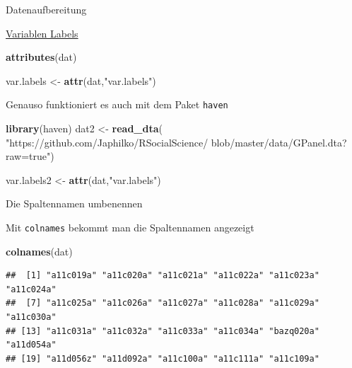 \documentclass[ignorenonframetext,]{beamer}
\newenvironment{Shaded}{}{}
\newcommand{\KeywordTok}[1]{\textcolor[rgb]{0.00,0.44,0.13}{\textbf{{#1}}}}
\newcommand{\StringTok}[1]{\textcolor[rgb]{0.25,0.44,0.63}{{#1}}}
\newcommand{\NormalTok}[1]{{#1}}
\begin{document}
\begin{frame}[fragile]{Datenaufbereitung}
\begin{block}{\href{https://stackoverflow.com/questions/2151147/using-stata-variable-labels-in-r}{Variablen
Labels}}
\begin{Shaded}
\begin{Highlighting}[]
\KeywordTok{attributes}\NormalTok{(dat)}
\end{Highlighting}
\end{Shaded}

\begin{Shaded}
\begin{Highlighting}[]
\NormalTok{var.labels <-}\StringTok{ }\KeywordTok{attr}\NormalTok{(dat,}\StringTok{"var.labels"}\NormalTok{)}
\end{Highlighting}
\end{Shaded}

\begin{block}{Genauso funktioniert es auch mit dem Paket \texttt{haven}}

\begin{Shaded}
\begin{Highlighting}[]
\KeywordTok{library}\NormalTok{(haven)}
\NormalTok{dat2 <-}\StringTok{ }\KeywordTok{read_dta}\NormalTok{(}
\StringTok{"https://github.com/Japhilko/RSocialScience/}
\StringTok{blob/master/data/GPanel.dta?raw=true"}\NormalTok{)}

\NormalTok{var.labels2 <-}\StringTok{ }\KeywordTok{attr}\NormalTok{(dat,}\StringTok{"var.labels"}\NormalTok{)}
\end{Highlighting}
\end{Shaded}

\end{block}

\end{block}

\begin{block}{Die Spaltennamen umbenennen}

\begin{block}{Mit \texttt{colnames} bekommt man die Spaltennamen
angezeigt}

\begin{Shaded}
\begin{Highlighting}[]
\KeywordTok{colnames}\NormalTok{(dat)}
\end{Highlighting}
\end{Shaded}

\begin{verbatim}
##  [1] "a11c019a" "a11c020a" "a11c021a" "a11c022a" "a11c023a" "a11c024a"
##  [7] "a11c025a" "a11c026a" "a11c027a" "a11c028a" "a11c029a" "a11c030a"
## [13] "a11c031a" "a11c032a" "a11c033a" "a11c034a" "bazq020a" "a11d054a"
## [19] "a11d056z" "a11d092a" "a11c100a" "a11c111a" "a11c109a"
\end{verbatim}


\end{block}
\end{block}
\end{frame}
\end{document}
